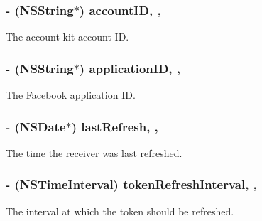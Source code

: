 \subsubsection[{account\+I\+D}]{\setlength{\rightskip}{0pt plus 5cm}-\/ (N\+S\+String$\ast$) account\+I\+D\hspace{0.3cm}{\ttfamily [read]}, {\ttfamily [nonatomic]}, {\ttfamily [copy]}}\label{protocol_a_k_f_access_token-p_aa429dd592beacda21fe207a2392c3150}
The account kit account I\+D. \hypertarget{protocol_a_k_f_access_token-p_a04cf0512105871b5c92d2f326930041b}{}
\subsubsection[{application\+I\+D}]{\setlength{\rightskip}{0pt plus 5cm}-\/ (N\+S\+String$\ast$) application\+I\+D\hspace{0.3cm}{\ttfamily [read]}, {\ttfamily [nonatomic]}, {\ttfamily [copy]}}\label{protocol_a_k_f_access_token-p_a04cf0512105871b5c92d2f326930041b}
The Facebook application I\+D. \hypertarget{protocol_a_k_f_access_token-p_a901024f76d3beb07dfce0b871dde60e8}{}
\subsubsection[{last\+Refresh}]{\setlength{\rightskip}{0pt plus 5cm}-\/ (N\+S\+Date$\ast$) last\+Refresh\hspace{0.3cm}{\ttfamily [read]}, {\ttfamily [nonatomic]}, {\ttfamily [copy]}}\label{protocol_a_k_f_access_token-p_a901024f76d3beb07dfce0b871dde60e8}
The time the receiver was last refreshed. \hypertarget{protocol_a_k_f_access_token-p_a7200387e19b2a491943aaa905be51c08}{}
\subsubsection[{token\+Refresh\+Interval}]{\setlength{\rightskip}{0pt plus 5cm}-\/ (N\+S\+Time\+Interval) token\+Refresh\+Interval\hspace{0.3cm}{\ttfamily [read]}, {\ttfamily [nonatomic]}, {\ttfamily [assign]}}\label{protocol_a_k_f_access_token-p_a7200387e19b2a491943aaa905be51c08}
The interval at which the token should be refreshed. \hypertarget{protocol_a_k_f_access_token-p_a5fd03e48f3df5c786cd971df95fb3c95}{}
